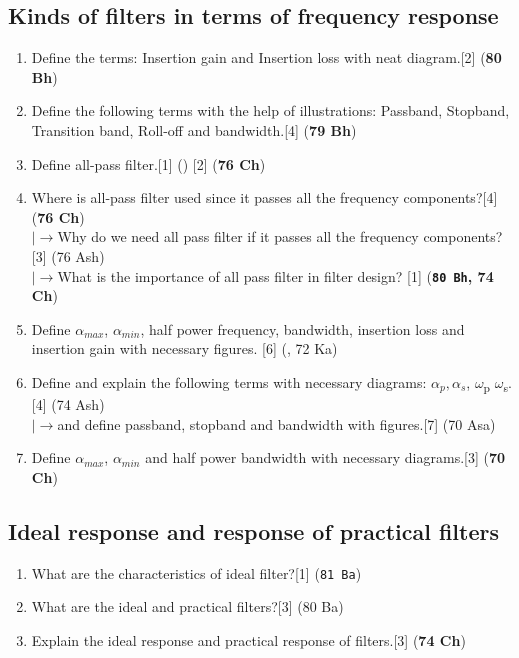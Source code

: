 \documentclass[12pt]{article}
\newcommand{\w}{\(\omega\)}
\newcommand{\lb}{\\$\left|\rightarrow\right.$}
\newcommand{\sub}[1]{\textsubscript{#1}}
\begin{document}
	\subsection{Kinds of filters in terms of frequency response}
		\begin{enumerate}
			\item Define the terms: Insertion gain and Insertion loss with neat diagram.\hfill[2] (\textbf{80 Bh})
			\item Define the following terms with the help of illustrations: Passband, Stopband, Transition band, Roll-off and bandwidth.\hfill[4] (\textbf{79 Bh})
			\item Define all-pass filter.\hfill[1] () [2] (\textbf{76 Ch})
			\item Where is all-pass filter used since it passes all the frequency components?\hfill[4] (\textbf{76 Ch})
			\lb Why do we need all pass filter if it passes all the frequency components?\hfill[3] (76 Ash)
			\lb  What is the importance of all pass filter in filter design? \hfill [1] (\textbf{\texttt{80 Bh}, 74 Ch})
			\item Define $\alpha_{max}$, $\alpha_{min}$, half power frequency, bandwidth, insertion loss and insertion gain with necessary figures. \hspace{11.4cm} [6] (, 72 Ka)
			\item Define and explain the following terms with necessary diagrams: $\alpha_p, \alpha_s$, \w\sub{p} \w\sub{s}.\hfill[4] (74 Ash)
			\lb and define passband, stopband and bandwidth with figures.\hfill[7] (70 Asa)
			\item Define $\alpha_{max}$, $\alpha_{min}$ and half power bandwidth with necessary diagrams.\hfill[3] (\textbf{70 Ch})
		\end{enumerate}

	\subsection{Ideal response and response of practical filters}
		\begin{enumerate}
			\item What are the characteristics of ideal filter?\hfill[1] (\texttt{81 Ba})
			\item What are the ideal and practical filters?\hfill[3] (80 Ba)
			\item Explain the ideal response and practical response of filters.\hfill[3] (\textbf{74 Ch})
		\end{enumerate}
\end{document}
